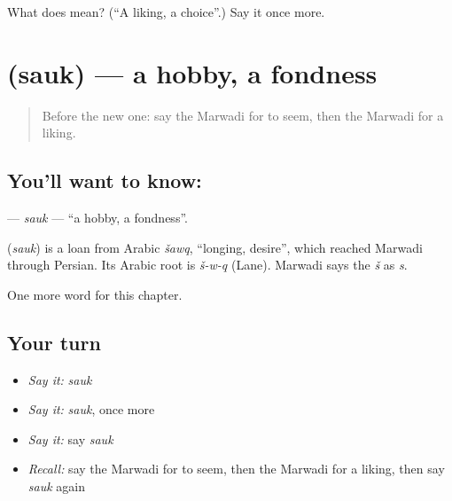 \begin{tcolorbox}[breakable,colback=teal!4,colframe=teal!35!black,title={Before you move on}]
What does  mean? (\textquotedblleft{}A liking, a choice\textquotedblright{}.) Say it once more.
\end{tcolorbox}
\section[\texorpdfstring{\mw{सौक} (sauk)}{सौक (sauk)}]{ (sauk) — a hobby, a fondness}

\label{lesson:MW-C113-sauk}



\begin{quote}
Before the new one: say the Marwadi for to seem, then the Marwadi for a liking.
\end{quote}

\subsection*{You'll want to know: }
\textbf{} — \emph{sauk} — \textquotedblleft{}a hobby, a fondness\textquotedblright{}.

\begin{cousinweb}
\textbf{} (\emph{sauk}) is a loan from Arabic \emph{šawq}, \textquotedblleft{}longing, desire\textquotedblright{}, which reached Marwadi through Persian. Its Arabic root is \emph{š-w-q} (Lane). Marwadi says the \emph{š} as \emph{s}.
\end{cousinweb}

\begin{grammarlens}[title={What you've built}]
One more word for this chapter.
\end{grammarlens}

\subsection*{Your turn}
\begin{itemize}
\raggedright
  \item \emph{Say it:} \emph{sauk}
  \item \emph{Say it:} \emph{sauk}, once more
  \item \emph{Say it:} say \emph{sauk}
  \item \emph{Recall:} say the Marwadi for to seem, then the Marwadi for a liking, then say \emph{sauk} again
\end{itemize}

